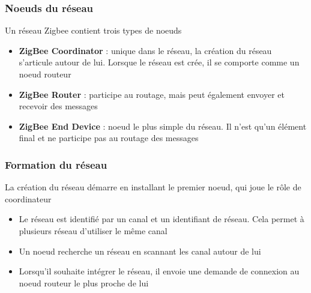 \documentclass{beamer}
\begin{document}
  \begin{frame}
   \frametitle{Noeuds du réseau}
   \begin{block}{Un réseau Zigbee contient trois types de noeuds}
      \begin{itemize}
	\item \textbf{ZigBee Coordinator} : unique dans le réseau, la création du réseau s'articule autour de lui. Lorsque le réseau est crée, il se comporte comme un noeud routeur
	\item \textbf{ZigBee Router} : participe au routage, mais peut également envoyer et recevoir des messages
	\item \textbf{ZigBee End Device} : noeud le plus simple du réseau. Il n'est qu'un élément final et ne participe pas au routage des messages
      \end{itemize}
    \end{block}	
  \end{frame}
  
  \begin{frame}
   \frametitle{Formation du réseau}
   \begin{block}{La création du réseau démarre en installant le premier noeud, qui joue le rôle de coordinateur}
    \begin{itemize}
     \item Le réseau est identifié par un canal et un identifiant de réseau. Cela permet à plusieurs réseau d'utiliser le même canal
     \item Un noeud recherche un réseau en scannant les canal autour de lui
     \item Lorsqu'il souhaite intégrer le réseau, il envoie une demande de connexion au noeud routeur le plus proche de lui 
    \end{itemize}
   \end{block}
  \end{frame}
\end{document}

